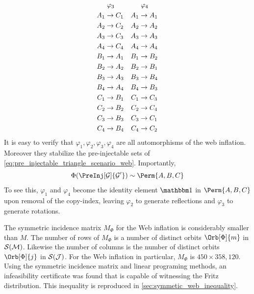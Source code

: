 \documentclass[aps, 10pt, english, twoside, pra, nofootinbib, tightenlines, longbibliography]{revtex4-1}
\renewcommand{\Events}[1]{\mathcal{S}\br{#1}} %
\begin{document}
\begin{equation*}
\begin{aligned}[c]
    &\hspace{1mm}\varphi_3 \\
    A_1 &\to C_1 \\A_2 &\to C_2 \\A_3 &\to C_3 \\A_4 &\to C_4 \\B_1 &\to A_1 \\B_2 &\to A_2 \\B_3 &\to A_3 \\B_4 &\to A_4 \\C_1 &\to B_1 \\C_2 &\to B_2 \\C_3 &\to B_3 \\C_4 &\to B_4
    \end{aligned}
    \quad
    \begin{aligned}[c]
    &\hspace{1mm}\varphi_4 \\
    A_1 &\to A_1 \\A_2 &\to A_2 \\A_3 &\to A_3 \\A_4 &\to A_4 \\B_1 &\to B_2 \\B_2 &\to B_1 \\B_3 &\to B_4 \\B_4 &\to B_3 \\C_1 &\to C_3 \\C_2 &\to C_4 \\C_3 &\to C_1 \\C_4 &\to C_2
    \end{aligned}
    \end{equation*}
    It is easy to verify that $\varphi_1, \varphi_2, \varphi_3, \varphi_4$ are all automorphisms of the web inflation. Moreover they stabilize the pre-injectable sets of \cref{eq:pre_injectable_triangle_scenario_web}. Importantly,
    \[ \gp\br{\PreInj[\graph]{\graph'}} \sim \Perm{A,B,C} \]
    To see this, $\varphi_1$ and $\varphi_4$ become the identity element $\ident$ in $\Perm{A,B,C}$ upon removal of the copy-index, leaving $\varphi_2$ to generate reflections and $\varphi_3$ to generate rotations.

    The symmetric incidence matrix $M_{\Phi}$ for the Web inflation is considerably smaller than $M$. The number of rows of $M_{\Phi}$ is a number of distinct orbits $\Orb[\Phi]{m}$ in $\Events{\mscenario}$. Likewise the number of columns is the number of distinct orbits $\Orb[\Phi]{j}$ in $\Events{\jointvar}$. For the Web inflation in particular, $M_{\Phi}$ is $450 \times 358,120$. Using the symmetric incidence matrix and linear programing methods, an infeasibility certificate was found that is capable of witnessing the Fritz distribution. This inequality is reproduced in \cref{sec:symmetic_web_inequality}.
\end{document}

